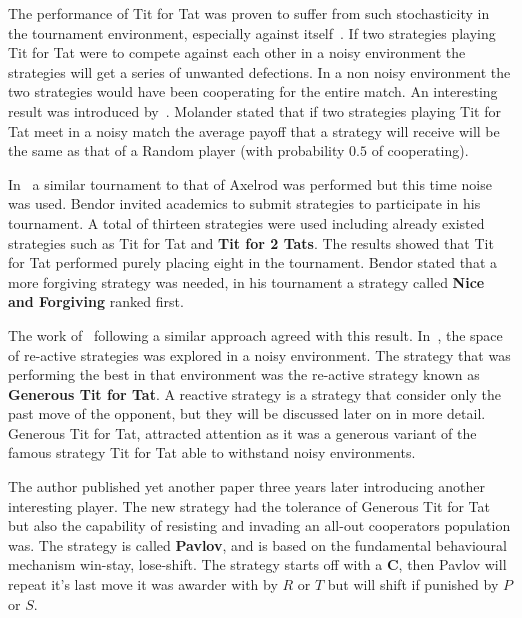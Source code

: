 \documentclass{article}
\begin{document}
The performance of Tit for Tat was proven to suffer from such stochasticity in
the tournament environment, especially against itself~\cite{Bendor1991,Godfray1992,
Molander1985, Nowak1992, Wolfgang2006}. If two strategies playing Tit for Tat were
to compete against each other in a noisy environment the strategies will get 
a series of unwanted defections. In a non noisy environment
the two strategies would have been cooperating for the entire match.
An interesting result was introduced by~\cite{Molander1985}. Molander stated
that if two strategies playing Tit for Tat meet in a noisy match the average
payoff that a strategy will receive will be the same as that of a Random player
(with probability \(0.5\) of cooperating). 

In~\cite{Bendor1991} a similar tournament to that of Axelrod was performed 
but this time noise was used. Bendor invited academics to submit strategies 
to participate in his tournament. A total of thirteen strategies were used 
including already existed strategies such as Tit for Tat and \textbf{Tit for 2 
Tats}. The results showed that Tit for Tat performed purely placing eight in
the tournament. Bendor stated that a more forgiving strategy was needed, in his
tournament a strategy called \textbf{Nice and Forgiving} ranked first.

The work of~\cite{Nowak1990} following a similar approach agreed with this result.
In~\cite{Nowak1990}, the space of re-active strategies was explored in a noisy
environment. The strategy that was performing the best in that environment was
the re-active strategy known as \textbf{Generous Tit for Tat}. A reactive 
strategy is a strategy that consider only the past move of the opponent, but 
they will be discussed later on in more detail. Generous Tit for Tat, attracted
attention as it was a generous variant of the famous strategy Tit for Tat able
to withstand noisy environments.

The author published yet another paper three years later introducing another
interesting player. The new strategy had the tolerance of Generous Tit for Tat 
but also the capability of resisting and invading an all-out cooperators population
was. The strategy is called \textbf{Pavlov},
and is based on the fundamental behavioural mechanism win-stay, lose-shift.
The strategy starts off with a \textbf{C}, then Pavlov will repeat it's last
move it was awarder with by \(R\) or \(T\) but will shift if punished by \(P\) or
\(S\).

\end{document}
